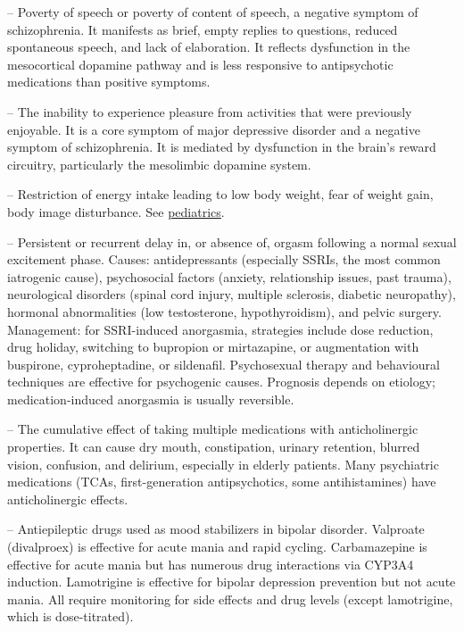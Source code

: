 -- Poverty of speech or poverty of content of speech, a negative symptom of schizophrenia. It manifests as brief, empty replies to questions, reduced spontaneous speech, and lack of elaboration. It reflects dysfunction in the mesocortical dopamine pathway and is less responsive to antipsychotic medications than positive symptoms.

-- The inability to experience pleasure from activities that were previously enjoyable. It is a core symptom of major depressive disorder and a negative symptom of schizophrenia. It is mediated by dysfunction in the brain's reward circuitry, particularly the mesolimbic dopamine system.

-- Restriction of energy intake leading to low body weight, fear of weight gain, body image disturbance. See \hyperlink{Pediatrics}{pediatrics}.

-- Persistent or recurrent delay in, or absence of, orgasm following a normal sexual excitement phase. Causes: antidepressants (especially SSRIs, the most common iatrogenic cause), psychosocial factors (anxiety, relationship issues, past trauma), neurological disorders (spinal cord injury, multiple sclerosis, diabetic neuropathy), hormonal abnormalities (low testosterone, hypothyroidism), and pelvic surgery. Management: for SSRI-induced anorgasmia, strategies include dose reduction, drug holiday, switching to bupropion or mirtazapine, or augmentation with buspirone, cyproheptadine, or sildenafil. Psychosexual therapy and behavioural techniques are effective for psychogenic causes. Prognosis depends on etiology; medication-induced anorgasmia is usually reversible.

-- The cumulative effect of taking multiple medications with anticholinergic properties. It can cause dry mouth, constipation, urinary retention, blurred vision, confusion, and delirium, especially in elderly patients. Many psychiatric medications (TCAs, first-generation antipsychotics, some antihistamines) have anticholinergic effects.

-- Antiepileptic drugs used as mood stabilizers in bipolar disorder. Valproate (divalproex) is effective for acute mania and rapid cycling. Carbamazepine is effective for acute mania but has numerous drug interactions via CYP3A4 induction. Lamotrigine is effective for bipolar depression prevention but not acute mania. All require monitoring for side effects and drug levels (except lamotrigine, which is dose-titrated).

